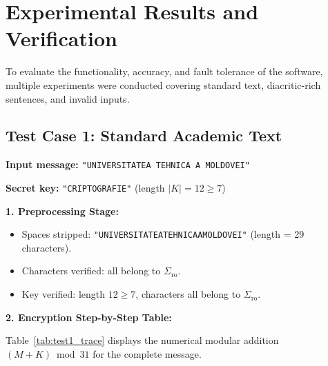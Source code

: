 \documentclass[11pt,a4paper]{article}
\begin{document}
\newpage
\section{Experimental Results and Verification}

To evaluate the functionality, accuracy, and fault tolerance of the software, multiple experiments were conducted covering standard text, diacritic-rich sentences, and invalid inputs.

\subsection{Test Case 1: Standard Academic Text}

\noindent\textbf{Input message:} \texttt{"UNIVERSITATEA TEHNICA A MOLDOVEI"}\par
\noindent\textbf{Secret key:} \texttt{"CRIPTOGRAFIE"} (length $|K| = 12 \ge 7$)\par
\smallskip

\noindent\textbf{1. Preprocessing Stage:}
\begin{itemize}
  \item Spaces stripped: \texttt{"UNIVERSITATEATEHNICAAMOLDOVEI"} (length = 29 characters).
  \item Characters verified: all belong to $\Sigma_{\text{ro}}$.
  \item Key verified: length $12 \ge 7$, characters all belong to $\Sigma_{\text{ro}}$.
\end{itemize}

\noindent\textbf{2. Encryption Step-by-Step Table:}

Table~\ref{tab:test1_trace} displays the numerical modular addition $(M + K) \bmod 31$ for the complete message.
\end{document}
